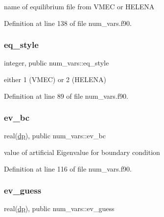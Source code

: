 name of equilibrium file from V\+M\+EC or H\+E\+L\+E\+NA 



Definition at line 138 of file num\+\_\+vars.\+f90.

\mbox{\label{namespacenum__vars_a7d8763402037dbb80db19e2534ddf595}} 
\subsubsection{\texorpdfstring{eq\+\_\+style}{eq\_style}}
{\footnotesize\ttfamily integer, public num\+\_\+vars\+::eq\+\_\+style}



either 1 (V\+M\+EC) or 2 (H\+E\+L\+E\+NA) 



Definition at line 89 of file num\+\_\+vars.\+f90.

\mbox{\label{namespacenum__vars_a4efc3cca2482236a18b8927bca8361c2}} 
\subsubsection{\texorpdfstring{ev\+\_\+bc}{ev\_bc}}
{\footnotesize\ttfamily real(\hyperlink{namespacenum__vars_a03802aa2bd86439d7a9370836fabf3f2}{dp}), public num\+\_\+vars\+::ev\+\_\+bc}



value of artificial Eigenvalue for boundary condition 



Definition at line 116 of file num\+\_\+vars.\+f90.

\mbox{\label{namespacenum__vars_a4c19f47e50c92bfd52985761500a999e}} 
\subsubsection{\texorpdfstring{ev\+\_\+guess}{ev\_guess}}
{\footnotesize\ttfamily real(\hyperlink{namespacenum__vars_a03802aa2bd86439d7a9370836fabf3f2}{dp}), public num\+\_\+vars\+::ev\+\_\+guess}



